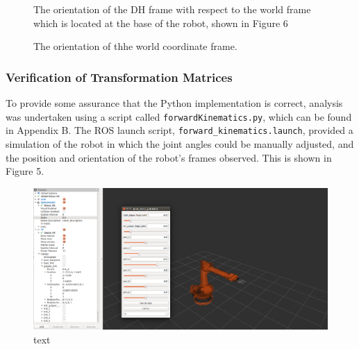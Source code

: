 \documentclass[a4paper]{article}
\begin{document}
\begin{figure}[h]
	\centering
	\begin{minipage}[b]{0.45\textwidth}
		\centering
		\caption{The orientation of the DH frame with respect to the world frame which is located at the base of the robot, shown in Figure 6}
	\end{minipage}
	\begin{minipage}[b]{0.45\textwidth}
		\centering
		\caption{The orientation of thhe world coordinate frame.}
	\end{minipage}
\end{figure}


\subsubsection{Verification of Transformation Matrices}
To provide some assurance that the Python implementation is correct, analysis was undertaken using a script called \verb|forwardKinematics.py|, which can be found in Appendix B. The ROS launch script, \verb|forward_kinematics.launch|, provided a simulation of the robot in which the joint angles could be manually adjusted, and the position and orientation of the robot's frames observed. This is shown in Figure 5.

\begin{figure}[h]
	\centering
	\includegraphics[scale=0.2]{rviz_fk_debug}
	\caption{text}
\end{figure}
\end{document}
